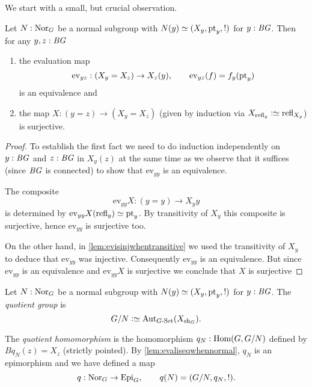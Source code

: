 We start with a small, but crucial observation.
\begin{lemma}
  \label{lem:evaliseqwhennormal}
  Let $N:\mathrm{Nor}_G$ be a normal subgroup with $N(y)\oldequiv (X_y,\pt_y,!)$ for $y:\mathit{B}\mathit{G}$.
  Then for any $y,z:\mathit{B}\mathit{G}$
  \begin{enumerate}
  \item the evaluation map
$$\mathrm{ev}_{yz}:(X_y=X_z)\to X_z(y),\qquad \mathrm{ev}_{yz}(f)=f_y(\mathrm{pt}_y)$$
is an equivalence and
  \item  the map $X:(y=z)\to(X_y=X_z)$ (given by induction via $X_{\refl y}\defequi\refl{X_y}$) is surjective.
  \end{enumerate}
\end{lemma}
\begin{proof}
To establish the first fact we need to do induction independently on $y:\mathit{B}\mathit{G}$ and $z:\mathit{B}\mathit{G}$ in $X_y(z)$ at the same time as we observe that it suffices (since $\mathit{B}\mathit{G}$ is connected) to show that $\mathrm{ev}_{yy}$ is an equivalence.

The composite
$$\mathrm{ev}_{yy}X:(y=y)\to X_yy$$ is determined by $\mathrm{ev}_{yy}X(\refl y)\oldequiv \pt_y$.
By transitivity of $X_y$ this composite is surjective, hence $\mathrm{ev}_{yy}$ is surjective too.

On the other hand, in  \cref{lem:evisinjwhentransitive} we used the transitivity of $X_y$ to deduce that $\mathrm{ev}_{yy}$ was injective.  Consequently $\mathrm{ev}_{yy}$ is an equivalence.  But since $\mathrm{ev}_{yy}$ is an equivalence and $\mathrm{ev}_{yy}X$ is surjective we conclude that $X$ is surjective
\end{proof}
\begin{definition}
\label{def:normalquotient}
Let $N:\mathrm{Nor}_G$ be a normal subgroup with $N(y)\oldequiv (X_y,\pt_y,!)$ for $y:\mathit{B}\mathit{G}$.  The \emph{quotient group} is
$$G/N\defequi\aut_{G\text{-}\Set}(X_{\shape_G}).
$$

The \emph{quotient homomorphism} is the homomorphism $q_N:\Hom(G,G/N)$  defined by $Bq_N(z)=X_z$ (strictly pointed).
By \cref{lem:evaliseqwhennormal}, $q_N$ is an epimorphism and we have defined a map
$$q:\mathrm{Nor}_G\to\mathrm{Epi}_G,\qquad q(N)=(G/N,q_N,!).$$
\end{definition}

